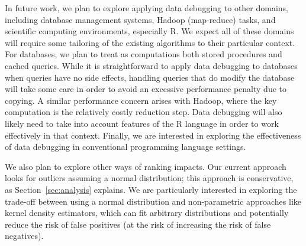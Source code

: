 In future work, we plan to explore applying data debugging to other
domains, including database management systems, Hadoop (map-reduce)
tasks, and scientific computing environments, especially R. We expect
all of these domains will require some tailoring of the existing
algorithms to their particular context. For databases, we plan to
treat as computations both stored procedures and cached queries. While
it is straightforward to apply data debugging to databases when
queries have no side effects, handling queries that do modify the
database will take some care in order to avoid an excessive
performance penalty due to copying. A similar performance concern
arises with Hadoop, where the key computation is the relatively costly
reduction step. Data debugging will also likely need to take into
account features of the R language in order to work effectively in
that context. Finally, we are interested in exploring the
effectiveness of data debugging in conventional programming language
settings.

We also plan to explore other ways of ranking impacts. Our current
approach looks for outliers assuming a normal distribution; this
approach is conservative, as Section~\ref{sec:analysis} explains. We
are particularly interested in exploring the trade-off between using a
normal distribution and non-parametric approaches like kernel
density estimators, which can fit arbitrary distributions and
potentially reduce the risk of false positives (at the risk of
increasing the risk of false negatives).
